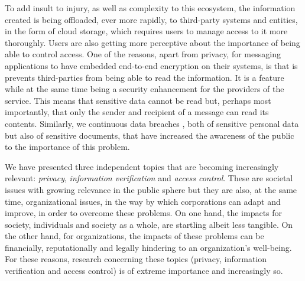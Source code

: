 To add insult to injury, as well as complexity to this ecosystem, the information created is being offloaded, ever more rapidly, to third-party systems and entities, in the form of cloud storage, which requires users to manage access to it more thoroughly. Users are also getting more perceptive about the importance of being able to control access. One of the reasons, apart from privacy, for messaging applications to have embedded end-to-end encryption on their systems, is that is prevents third-parties from being able to read the information. It is a feature while at the same time being a security enhancement for the providers of the service. This means that sensitive data cannot be read but, perhaps most importantly, that only the sender and recipient of a message can read its contents. Similarly, we continuous data breaches \cite{edwards_hype_2016}, both of sensitive personal data but also of sensitive documents, that have increased the awareness of the public to the importance of this problem.

We have presented three independent topics that are becoming increasingly relevant: \textit{privacy}, \textit{information verification} and \textit{access control}. These are societal issues with growing relevance in the public sphere but they are also, at the same time, organizational issues, in the way by which corporations can adapt and improve, in order to overcome these problems. On one hand, the impacts for society, individuals and society as a whole, are startling albeit less tangible. On the other hand, for organizations, the impacts of these problems can be financially, reputationally and legally hindering to an organization's well-being. For these reasons, research concerning these topics (privacy, information verification and access control) is of extreme importance and increasingly so.

